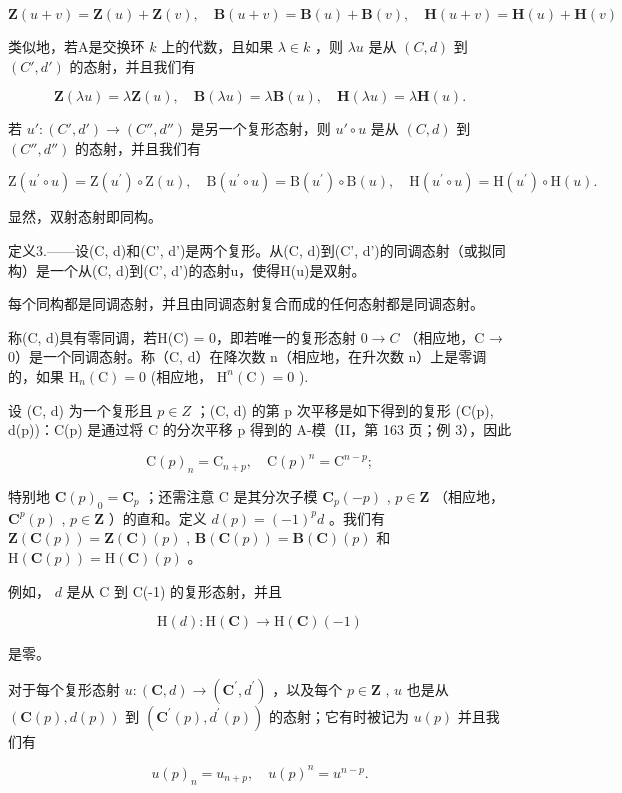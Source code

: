 \[
\mathbf {Z} (u + v) = \mathbf {Z} (u) + \mathbf {Z} (v), \quad \mathbf {B} (u + v) = \mathbf {B} (u) + \mathbf {B} (v), \quad \mathbf {H} (u + v) = \mathbf {H} (u) + \mathbf {H} (v)
\]

类似地，若A是交换环 \(k\) 上的代数，且如果 \(\lambda \in k\) ，则 \(\lambda u\) 是从 \((C, d)\) 到 \((C', d')\) 的态射，并且我们有

\[
\mathbf {Z} (\lambda u) = \lambda \mathbf {Z} (u), \quad \mathbf {B} (\lambda u) = \lambda \mathbf {B} (u), \quad \mathbf {H} (\lambda u) = \lambda \mathbf {H} (u).
\]

若 \(u': (C', d') \to (C'', d'')\) 是另一个复形态射，则 \(u' \circ u\) 是从 \((C, d)\) 到 \((C'', d'')\) 的态射，并且我们有

\[
\mathrm{Z} \left(u ^ {\prime} \circ u\right) = \mathrm{Z} \left(u ^ {\prime}\right) \circ \mathrm{Z} (u), \quad \mathrm{B} \left(u ^ {\prime} \circ u\right) = \mathrm{B} \left(u ^ {\prime}\right) \circ \mathrm{B} (u), \quad \mathrm{H} \left(u ^ {\prime} \circ u\right) = \mathrm{H} \left(u ^ {\prime}\right) \circ \mathrm{H} (u).
\]

显然，双射态射即同构。

定义3.——设(C, d)和(C', d')是两个复形。从(C, d)到(C', d')的同调态射（或拟同构）是一个从(C, d)到(C', d')的态射u，使得H(u)是双射。

每个同构都是同调态射，并且由同调态射复合而成的任何态射都是同调态射。

称(C, d)具有零同调，若H(C) = 0，即若唯一的复形态射 \(0 \rightarrow C\) （相应地，C → 0）是一个同调态射。称（C, d）在降次数 n（相应地，在升次数 n）上是零调的，如果 \(\mathrm{H}_{n}(\mathrm{C}) = 0\) (相应地， \(\mathrm{H}^{n}(\mathrm{C}) = 0\) ).

设 (C, d) 为一个复形且 \(p \in Z\) ；(C, d) 的第 p 次平移是如下得到的复形 (C(p), d(p))：C(p) 是通过将 C 的分次平移 p 得到的 A-模（II，第 163 页；例 3），因此

\[
\mathrm{C} (p) _ {n} = \mathrm{C} _ {n + p}, \quad \mathrm{C} (p) ^ {n} = \mathrm{C} ^ {n - p};
\]

特别地 \(\mathbf{C}(p)_{0} = \mathbf{C}_{p}\) ；还需注意 C 是其分次子模 \(\mathbf{C}_{p}(-p)\) , \(p \in \mathbf{Z}\) （相应地， \(\mathbf{C}^{p}(p)\) , \(p \in \mathbf{Z}\) ）的直和。定义 \(d(p) = (-1)^{p} d\) 。我们有 \(\mathbf{Z}(\mathbf{C}(p)) = \mathbf{Z}(\mathbf{C})(p)\) , \(\mathbf{B}(\mathbf{C}(p)) = \mathbf{B}(\mathbf{C})(p)\) 和 \(\mathrm{H}(\mathbf{C}(p)) = \mathrm{H}(\mathbf{C})(p)\) 。

例如， \(d\) 是从 C 到 C(-1) 的复形态射，并且

\[
\mathrm{H} (d): \mathrm{H} (\mathbf {C}) \to \mathrm{H} (\mathbf {C}) (- 1)
\]

是零。

对于每个复形态射 \(u:(\mathbf{C},d)\to(\mathbf{C}^{\prime},d^{\prime})\) ，以及每个 \(p\in\mathbf{Z}\) , \(u\) 也是从 \((\mathbf{C}(p),d(p))\) 到 \((\mathbf{C}^{\prime}(p),d^{\prime}(p))\) 的态射；它有时被记为 \(u(p)\) 并且我们有

\[
u (p) _ {n} = u _ {n + p}, \quad u (p) ^ {n} = u ^ {n - p}.
\]
